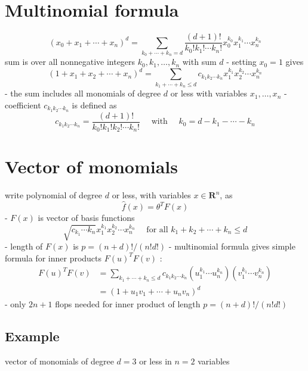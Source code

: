 \section{Multinomial formula}

$$
\left(x_{0}+x_{1}+\cdots+x_{n}\right)^{d}=\sum_{k_{0}+\cdots+k_{n}=d} \frac{(d+1) !}{k_{0} ! k_{1} ! \cdots k_{n} !} x_{0}^{k_{0}} x_{1}^{k_{1}} \cdots x_{n}^{k_{n}}
$$
sum is over all nonnegative integers $k_{0}, k_{1}, \ldots, k_{n}$ with sum $d$
- setting $x_{0}=1$ gives
$$
\left(1+x_{1}+x_{2}+\cdots+x_{n}\right)^{d}=\sum_{k_{1}+\cdots+k_{n} \leq d} c_{k_{1} k_{2} \cdots k_{n}} x_{1}^{k_{1}} x_{2}^{k_{2}} \cdots x_{n}^{k_{n}}
$$
- the sum includes all monomials of degree $d$ or less with variables $x_{1}, \ldots, x_{n}$
- coefficient $c_{k_{1} k_{2} \cdots k_{n}}$ is defined as
$$
c_{k_{1} k_{2} \cdots k_{n}}=\frac{(d+1) !}{k_{0} ! k_{1} ! k_{2} ! \cdots k_{n} !} \quad \text { with } \quad k_{0}=d-k_{1}-\cdots-k_{n}
$$

\section{Vector of monomials}

write polynomial of degree $ d $ or less, with variables $ x \in \mathbf{R}^{n} $, as
$$
\hat{f}(x)=\theta^{T} F(x)
$$
- $ F(x) $ is vector of basis functions
$$
\sqrt{c_{k_{1}} \cdots k_{n}} x_{1}^{k_{1}} x_{2}^{k_{2}} \cdots x_{n}^{k_{n}} \quad \text { for all } k_{1}+k_{2}+\cdots+k_{n} \leq d
$$
- length of $ F(x) $ is $ p=(n+d) ! /(n ! d !) $
- multinomial formula gives simple formula for inner products $ F(u)^{T} F(v) $ :
$$
\begin{aligned}
F(u)^{T} F(v) &=\sum_{k_{1}+\cdots+k_{n} \leq d} c_{k_{1} k_{2} \cdots k_{n}}\left(u_{1}^{k_{1}} \cdots u_{n}^{k_{n}}\right)\left(v_{1}^{k_{1}} \cdots v_{n}^{k_{n}}\right) \\
&=\left(1+u_{1} v_{1}+\cdots+u_{n} v_{n}\right)^{d}
\end{aligned}
$$
- only $ 2 n+1 $ flops needed for inner product of length $ p=(n+d) ! /(n ! d !) $

\subsection{Example}

vector of monomials of degree $ d=3 $ or less in $ n=2 $ variables

